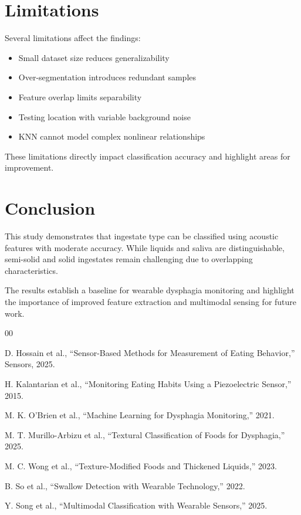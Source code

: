 \documentclass[conference]{IEEEtran}
\begin{document}
\section{Limitations}

Several limitations affect the findings:

\begin{itemize}
    \item Small dataset size reduces generalizability
    \item Over-segmentation introduces redundant samples
    \item Feature overlap limits separability
     \item Testing location with variable background noise
    \item KNN cannot model complex nonlinear relationships
\end{itemize}

These limitations directly impact classification accuracy and highlight areas for improvement.

\section{Conclusion}

This study demonstrates that ingestate type can be classified using acoustic features with moderate accuracy. While liquids and saliva are distinguishable, semi-solid and solid ingestates remain challenging due to overlapping characteristics.

The results establish a baseline for wearable dysphagia monitoring and highlight the importance of improved feature extraction and multimodal sensing for future work.

\begin{thebibliography}{00}

D. Hossain et al., “Sensor-Based Methods for Measurement of Eating Behavior,” Sensors, 2025.

H. Kalantarian et al., “Monitoring Eating Habits Using a Piezoelectric Sensor,” 2015.

M. K. O’Brien et al., “Machine Learning for Dysphagia Monitoring,” 2021.

M. T. Murillo-Arbizu et al., “Textural Classification of Foods for Dysphagia,” 2025.

M. C. Wong et al., “Texture-Modified Foods and Thickened Liquids,” 2023.

B. So et al., “Swallow Detection with Wearable Technology,” 2022.

Y. Song et al., “Multimodal Classification with Wearable Sensors,” 2025.

\end{thebibliography}
\end{document}
